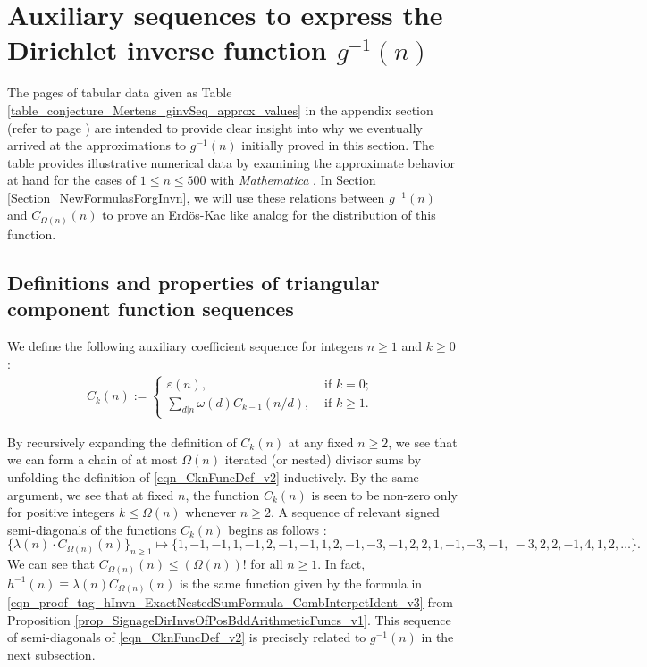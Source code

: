 \documentclass[11pt,reqno,a4letter]{article}
\numberwithin{figure}{section}
\numberwithin{table}{section}
\newcommand{\seqnum}[1]{\href{http://oeis.org/#1}{\color{ProcessBlue}{\underline{#1}}}}
\theoremstyle{plain}
\numberwithin{theorem}{section}
\theoremstyle{definition}
\begin{document}
\newpage
\section{Auxiliary sequences to express the Dirichlet inverse function $g^{-1}(n)$} 
\label{Section_InvFunc_PreciseExpsAndAsymptotics} 

The pages of tabular data given as Table \ref{table_conjecture_Mertens_ginvSeq_approx_values} 
in the appendix section (refer to 
page \pageref{table_conjecture_Mertens_ginvSeq_approx_values}) are intended to 
provide clear insight into why we eventually arrived at the approximations to 
$g^{-1}(n)$ initially proved in this section. The table provides illustrative 
numerical data by examining the approximate behavior 
at hand for the cases of $1 \leq n \leq 500$ with \emph{Mathematica} 
\cite{SCHMIDT-MERTENS-COMPUTATIONS}. 
In Section \ref{Section_NewFormulasForgInvn}, 
we will use these relations between $g^{-1}(n)$ and 
$C_{\Omega(n)}(n)$ to prove an Erd\"os-Kac like analog for the distribution of this function. 

\subsection{Definitions and properties of triangular component function sequences} 

We define the following auxiliary coefficient sequence for integers $n \geq 1$ and $k \geq 0$: 
\begin{align} 
\label{eqn_CknFuncDef_v2} 
C_k(n) := \begin{cases} 
     \varepsilon(n), & \text{ if $k = 0$; } \\ 
     \sum\limits_{d|n} \omega(d) C_{k-1}(n/d), & \text{ if $k \geq 1$. } 
     \end{cases} 
\end{align} 

By recursively expanding the definition of $C_k(n)$ 
at any fixed $n \geq 2$, we see that 
we can form a chain of at most $\Omega(n)$ iterated (or nested) divisor sums by 
unfolding the definition of \eqref{eqn_CknFuncDef_v2} inductively. 
By the same argument, we see that at fixed $n$, the function 
$C_k(n)$ is seen to be non-zero only for positive integers 
$k \leq \Omega(n)$ whenever $n \geq 2$. 
A sequence of relevant signed semi-diagonals of the functions $C_k(n)$ begins as follows 
\cite[\seqnum{A008480}]{OEIS}: 
\[
\{\lambda(n) \cdot C_{\Omega(n)}(n) \}_{n \geq 1} \mapsto \{
     1, -1, -1, 1, -1, 2, -1, -1, 1, 2, -1, -3, -1, 2, 2, 1, -1, -3, -1, \
     -3, 2, 2, -1, 4, 1, 2, \ldots \}. 
\]
We can see that $C_{\Omega(n)}(n) \leq (\Omega(n))!$ for all $n \geq 1$. In fact, 
$h^{-1}(n) \equiv \lambda(n) C_{\Omega(n)}(n)$ is the same function given by 
the formula in \eqref{eqn_proof_tag_hInvn_ExactNestedSumFormula_CombInterpetIdent_v3} from 
Proposition \ref{prop_SignageDirInvsOfPosBddArithmeticFuncs_v1}. 
This sequence of semi-diagonals of 
\eqref{eqn_CknFuncDef_v2} 
is precisely related to $g^{-1}(n)$ in the next subsection. 
\end{document}
